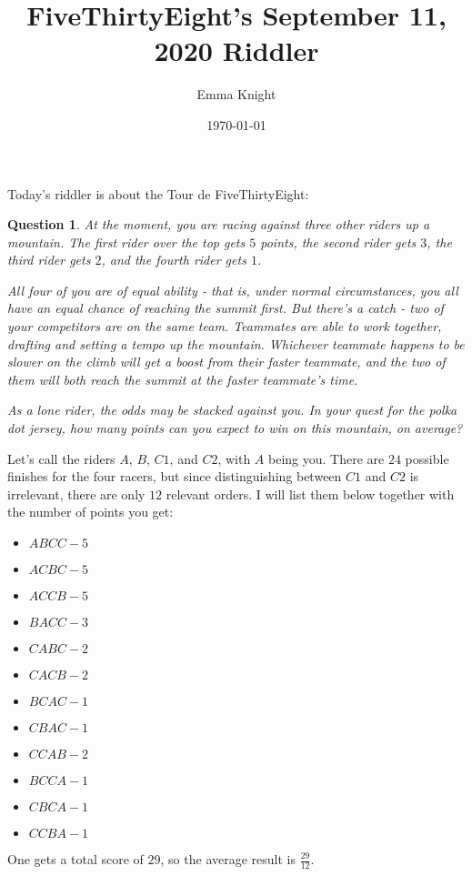 \documentclass[11pt]{article}
\title{FiveThirtyEight's September 11, 2020 Riddler}
\author{Emma Knight}
\date{\today}
\newtheorem{question}[theorem]{Question}
\theoremstyle{definition}
\begin{document}
\maketitle
Today's riddler is about the Tour de FiveThirtyEight:
\begin{question}
At the moment, you are racing against three other riders up a mountain. The first rider over the top gets $5$ points, the second rider gets $3$, the third rider gets $2$, and the fourth rider gets $1$.

All four of you are of equal ability - that is, under normal circumstances, you all have an equal chance of reaching the summit first. But there’s a catch - two of your competitors are on the same team. Teammates are able to work together, drafting and setting a tempo up the mountain. Whichever teammate happens to be slower on the climb will get a boost from their faster teammate, and the two of them will both reach the summit at the faster teammate’s time.

As a lone rider, the odds may be stacked against you. In your quest for the polka dot jersey, how many points can you expect to win on this mountain, on average?
\end{question}
Let's call the riders $A$, $B$, $C1$, and $C2$, with $A$ being you.  There are $24$ possible finishes for the four racers, but since distinguishing between $C1$ and $C2$ is irrelevant, there are only $12$ relevant orders.  I will list them below together with the number of points you get:
\begin{itemize}
\item $ABCC - 5$
\item $ACBC - 5$
\item $ACCB - 5$
\item $BACC - 3$
\item $CABC - 2$
\item $CACB - 2$
\item $BCAC - 1$
\item $CBAC - 1$
\item $CCAB - 2$
\item $BCCA - 1$
\item $CBCA - 1$
\item $CCBA - 1$
\end{itemize}
One gets a total score of $29$, so the average result is $\displaystyle{\frac{29}{12}}$.  
\end{document}
